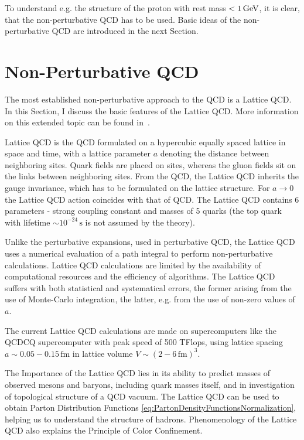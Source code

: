 To understand e.g. the structure of the proton with rest mass $< 1\,\text{GeV}$, it is
clear, that the 
non-perturbative QCD has to be used. Basic ideas of the non-perturbative QCD are
introduced in the next Section. 

\section{Non-Perturbative QCD}

The most established non-perturbative approach to the QCD is a Lattice QCD.
In this Section, I discuss the basic features of the Lattice QCD. More
information on this extended topic can be found in~\cite{QCDTextbook,LQCDIntro}.

Lattice QCD is the QCD formulated on a hypercubic equally spaced lattice in
space and time, with a lattice parameter $a$ denoting the distance between
neighboring sites.
Quark fields are placed on sites, whereas the gluon fields sit on the links
between neighboring sites. From the QCD, the Lattice QCD inherits the gauge
invariance, which has to be formulated on the lattice structure.
For $a \rightarrow 0$ the Lattice QCD action coincides with that of QCD. 
The Lattice QCD contains 6 parameters - strong coupling constant and masses of 5
quarks (the top quark with lifetime $ \sim 10^{-24}\,\text{s}$ is not assumed by
the theory).

Unlike the perturbative expansions, used in perturbative QCD, the Lattice QCD
uses a numerical evaluation of a path integral to perform non-perturbative
calculations. 
Lattice QCD calculations are limited by the availability of computational
resources and the efficiency of algorithms. The Lattice QCD suffers with both
statistical and systematical errors, the former arising from the use of
Monte-Carlo integration, the latter, e.g. from the use of non-zero values of
$a$.

The current Lattice QCD calculations are made on supercomputers like the QCDCQ
supercomputer \cite{SuperComputer} with peak speed of 500 TFlops, using lattice
spacing $a \sim 0.05 - 0.15 \, \text{fm}$ in lattice volume $V \sim (2 - 6
\,\text{fm} )^3$.

The Importance of the Lattice QCD lies in its ability to predict masses of observed
mesons and baryons, including quark masses itself, and in investigation of
topological structure of a QCD vacuum.  The Lattice QCD can be used to obtain
Parton Distribution Functions
\eqref{eq:PartonDensityFunctionsNormalization}, helping us to understand the
structure of hadrons. Phenomenology of the Lattice QCD also explains the Principle of Color
Confinement. 


